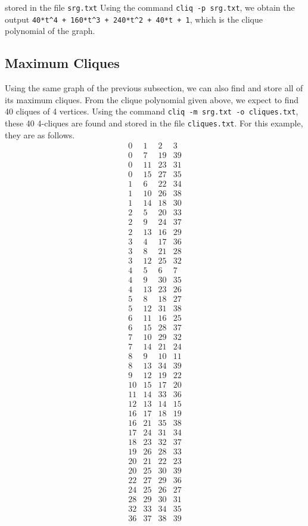 \documentclass[a4paper,10pt]{article}
\begin{document}
stored in the file {\tt srg.txt}
Using the command {\tt cliq -p srg.txt}, we obtain the output {\tt 40*t\^{}4 + 160*t\^{}3 + 240*t\^{}2 + 40*t + 1}, which is the clique polynomial of the graph.

\subsection{\sc Maximum Cliques}
Using the same graph of the previous subsection, we can also find and store all of its maximum cliques. From the clique polynomial given above, we expect to find 40 cliques of 4 vertices. Using the command {\tt cliq -m srg.txt -o cliques.txt}, these 40 4-cliques are found and stored in the file {\tt cliques.txt}. For this example, they are as follows.
\[
 \begin{array}{rrrr}
0 & 1 & 2 & 3 \\
0 & 7 & 19 & 39 \\
0 & 11 & 23 & 31 \\
0 & 15 & 27 & 35 \\
1 & 6 & 22 & 34 \\
1 & 10 & 26 & 38 \\
1 & 14 & 18 & 30 \\
2 & 5 & 20 & 33 \\
2 & 9 & 24 & 37 \\
2 & 13 & 16 & 29 \\
3 & 4 & 17 & 36 \\
3 & 8 & 21 & 28 \\
3 & 12 & 25 & 32 \\
4 & 5 & 6 & 7 \\
4 & 9 & 30 & 35 \\
4 & 13 & 23 & 26 \\
5 & 8 & 18 & 27 \\
5 & 12 & 31 & 38 \\
6 & 11 & 16 & 25 \\
6 & 15 & 28 & 37 \\
7 & 10 & 29 & 32 \\
7 & 14 & 21 & 24 \\
8 & 9 & 10 & 11 \\
8 & 13 & 34 & 39 \\
9 & 12 & 19 & 22 \\
10 & 15 & 17 & 20 \\
11 & 14 & 33 & 36 \\
12 & 13 & 14 & 15 \\
16 & 17 & 18 & 19 \\
16 & 21 & 35 & 38 \\
17 & 24 & 31 & 34 \\
18 & 23 & 32 & 37 \\
19 & 26 & 28 & 33 \\
20 & 21 & 22 & 23 \\
20 & 25 & 30 & 39 \\
22 & 27 & 29 & 36 \\
24 & 25 & 26 & 27 \\
28 & 29 & 30 & 31 \\
32 & 33 & 34 & 35 \\
36 & 37 & 38 & 39
\end{array}
\]
\end{document}
